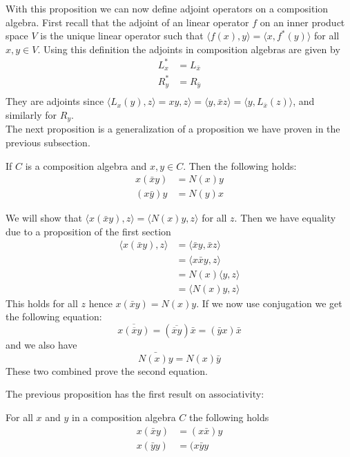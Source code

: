 \documentclass[../Thesis.tex]{subfiles}
\begin{document}
With this proposition we can now define adjoint operators on a composition algebra. First recall that the adjoint of an linear operator $f$ on an inner product space $V$ is the unique linear operator such that $\langle f(x), y \rangle = \langle x, f^*(y) \rangle$ for all $x,y \in V$. Using this definition the adjoints in composition algebras are given by
\begin{align*}
L^*_x &= L_{\bar{x}}\\
R^*_y &= R_{\bar{y}}\\
\end{align*}
They are adjoints since $\langle L_x(y), z \rangle = xy, z \rangle = \langle y, \bar{x}z \rangle = \langle y, L_{\bar{x}}(z) \rangle$, and similarly for $R_y$.
\\The next proposition is a generalization of a proposition we have proven in the previous subsection.
\begin{prop}
If $C$ is a composition algebra and $x,y \in C$. Then the following holds:
\begin{align}
x(\bar{x}y) &= N(x)y\\
(x\bar{y})y &= N(y)x
\end{align}
\end{prop}
\begin{myproof}
We will show that $\langle x(\bar{x}y), z \rangle = \langle N(x)y, z \rangle$ for all $z$. Then we have equality due to a proposition of the first section
\begin{align*}
\langle x ( \bar{x} y), z \rangle &= \langle \bar{x}y, \bar{x} z \rangle \\
&= \langle x \bar{x} y, z \rangle \\
&= N(x) \langle y, z \rangle \\
&= \langle N(x) y, z \rangle
\end{align*}
This holds for all $z$ hence $x(\bar{x} y) = N(x) y$.
If we now use conjugation we get the following equation:
\begin{equation}
\overline{x(\overline{x}y)} = (\overline{\overline{x}y}) \bar{x} = (\bar{y} x) \bar{x}
\end{equation}
and we also have
\begin{equation}
\bar{N(x)y} = N(x) \bar{y}
\end{equation}
These two combined prove the second equation.
\end{myproof}
The previous proposition has the first result on associativity:
\begin{Cor}
For all $x$ and $y$ in a composition algebra $C$ the following holds
\begin{align}
x(\bar{x}y) &= (x\bar{x})y\\
x(\bar{y}y) &= (x \bar{y}y\\
\end{align}
\end{Cor}
\end{document}
